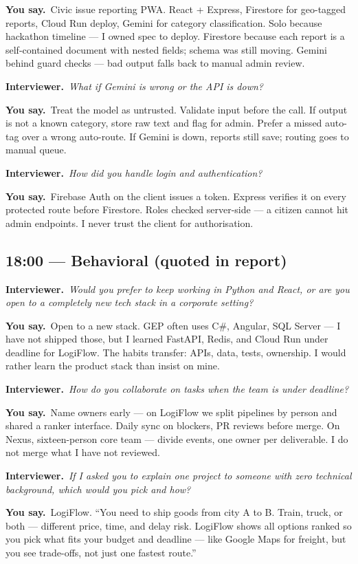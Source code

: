 \documentclass[11pt,a4paper]{article}
\newcommand{\IV}[1]{\par\vspace{4pt}\noindent\textcolor{qcol}{\textbf{Interviewer.}}~\textit{#1}\par}
\newcommand{\You}[1]{%
  \par\vspace{2pt}%
  \noindent\colorbox{youbg}{%
    \parbox{\dimexpr\textwidth-2\fboxsep}{\vspace{3pt}\textcolor{you}{\textbf{\small You say.}}~#1\vspace{3pt}}%
  }\par}
\begin{document}
\You{Civic issue reporting PWA. React + Express, Firestore for geo-tagged reports, Cloud Run deploy, Gemini for category classification. Solo because hackathon timeline --- I owned spec to deploy. Firestore because each report is a self-contained document with nested fields; schema was still moving. Gemini behind guard checks --- bad output falls back to manual admin review.}

\IV{What if Gemini is wrong or the API is down?}

\You{Treat the model as untrusted. Validate input before the call. If output is not a known category, store raw text and flag for admin. Prefer a missed auto-tag over a wrong auto-route. If Gemini is down, reports still save; routing goes to manual queue.}

\IV{How did you handle login and authentication?}

\You{Firebase Auth on the client issues a token. Express verifies it on every protected route before Firestore. Roles checked server-side --- a citizen cannot hit admin endpoints. I never trust the client for authorisation.}

\subsection*{18:00 --- Behavioral (quoted in report)}

\IV{Would you prefer to keep working in Python and React, or are you open to a completely new tech stack in a corporate setting?}

\You{Open to a new stack. GEP often uses C\#, Angular, SQL Server --- I have not shipped those, but I learned FastAPI, Redis, and Cloud Run under deadline for LogiFlow. The habits transfer: APIs, data, tests, ownership. I would rather learn the product stack than insist on mine.}

\IV{How do you collaborate on tasks when the team is under deadline?}

\You{Name owners early --- on LogiFlow we split pipelines by person and shared a ranker interface. Daily sync on blockers, PR reviews before merge. On Nexus, sixteen-person core team --- divide events, one owner per deliverable. I do not merge what I have not reviewed.}

\IV{If I asked you to explain one project to someone with zero technical background, which would you pick and how?}

\You{LogiFlow. ``You need to ship goods from city A to B. Train, truck, or both --- different price, time, and delay risk. LogiFlow shows all options ranked so you pick what fits your budget and deadline --- like Google Maps for freight, but you see trade-offs, not just one fastest route.''}
\end{document}

